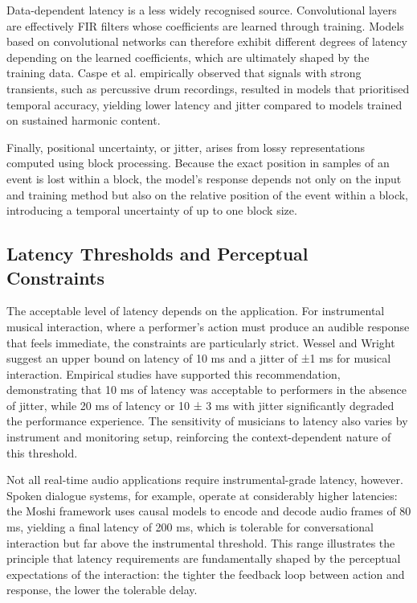 Data-dependent latency is a less widely recognised source. Convolutional layers are effectively FIR filters whose coefficients are learned through training. Models based on convolutional networks can therefore exhibit different degrees of latency depending on the learned coefficients, which are ultimately shaped by the training data. Caspe et al. empirically observed that signals with strong transients, such as percussive drum recordings, resulted in models that prioritised temporal accuracy, yielding lower latency and jitter compared to models trained on sustained harmonic content.\cite{caspe2025designing} 

Finally, positional uncertainty, or jitter, arises from lossy representations computed using block processing. Because the exact position in samples of an event is lost within a block, the model's response depends not only on the input and training method but also on the relative position of the event within a block, introducing a temporal uncertainty of up to one block size.

\subsection{Latency Thresholds and Perceptual Constraints}

The acceptable level of latency depends on the application. For instrumental musical interaction, where a performer's action must produce an audible response that feels immediate, the constraints are particularly strict. Wessel and Wright suggest an upper bound on latency of 10 ms and a jitter of ±1 ms for musical interaction. Empirical studies have supported this recommendation, demonstrating that 10 ms of latency was acceptable to performers in the absence of jitter, while 20 ms of latency or 10 ± 3 ms with jitter significantly degraded the performance experience. The sensitivity of musicians to latency also varies by instrument and monitoring setup, reinforcing the context-dependent nature of this threshold.\cite{caspe2025designing} 

Not all real-time audio applications require instrumental-grade latency, however. Spoken dialogue systems, for example, operate at considerably higher latencies: the Moshi framework uses causal models to encode and decode audio frames of 80 ms, yielding a final latency of 200 ms, which is tolerable for conversational interaction but far above the instrumental threshold.\cite{caspe2025designing}  This range illustrates the principle that latency requirements are fundamentally shaped by the perceptual expectations of the interaction: the tighter the feedback loop between action and response, the lower the tolerable delay.

